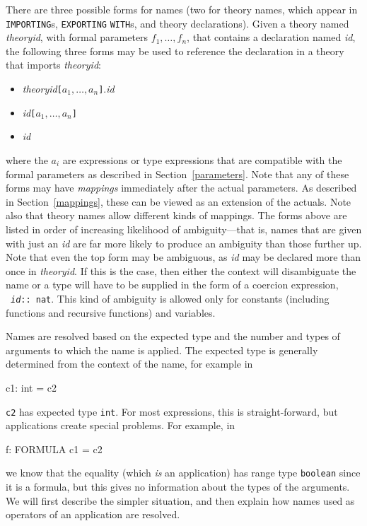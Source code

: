 There are three possible forms for names (two for theory names, which
appear in \texttt{IMPORTING}s, \texttt{EXPORTING} \texttt{WITH}s, and
theory declarations).  Given a theory named \emph{theoryid}, with formal
parameters $f_1,\ldots,f_n$, that contains a declaration named \emph{id},
the following three forms may be used to reference the declaration in a
theory that imports \emph{theoryid}:
\begin{itemize}
\item \emph{theoryid}\texttt{[$a_1,\ldots,a_n$]}.\emph{id}

\item \emph{id}\texttt{[$a_1,\ldots,a_n$]}

\item \emph{id}
\end{itemize}
where the $a_i$ are expressions or type expressions that are compatible
with the formal parameters as described in Section~\ref{parameters}.  Note
that any of these forms may have \emph{mappings} immediately after the
actual parameters.  As described in Section~\ref{mappings}, these can be
viewed as an extension of the actuals.  Note also that theory names allow
different kinds of mappings.  The forms above are listed in order of
increasing likelihood of ambiguity---that is, names that are given with
just an \emph{id} are far more likely to produce an ambiguity than those
further up.  Note that even the top form may be ambiguous, as \emph{id}
may be declared more than once in \emph{theoryid}.  If this is the case,
then either the context will disambiguate the name or a type will have to
be supplied in the form of a coercion expression, \eg\
\texttt{\emph{id}::~nat}.  This kind of ambiguity is allowed only for
constants (including functions and recursive functions) and variables.

Names are resolved based on the expected type and the number and types of
arguments to which the name is applied.  The expected type is generally
determined from the context of the name, for example in
\begin{pvsex}
  c1: int = c2
\end{pvsex}
\texttt{c2} has expected type \texttt{int}.  For most expressions, this is
straight-forward, but applications create special problems.  For example,
in
\begin{pvsex}
  f: FORMULA c1 = c2
\end{pvsex}
we know that the equality (which \emph{is} an application) has range type
\texttt{boolean} since it is a formula, but this gives no information
about the types of the arguments.  We will first describe the simpler
situation, and then explain how names used as operators of an application
are resolved.

